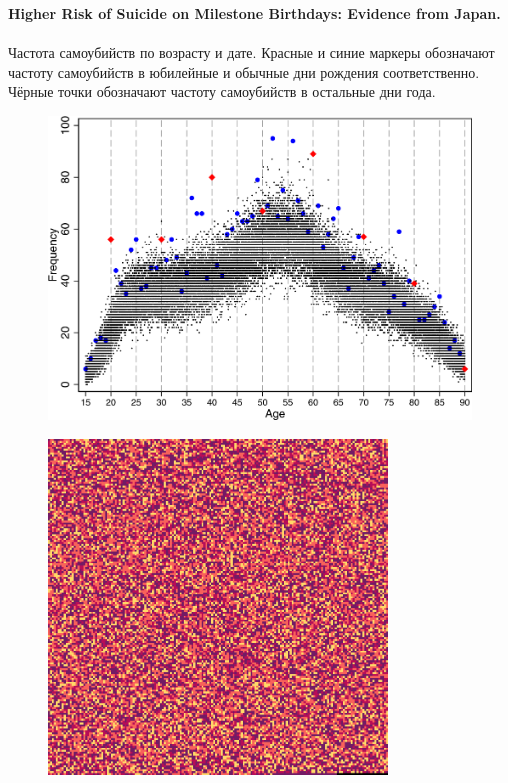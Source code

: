 \documentclass{beamer}
\begin{document}
\begin{frame}
\textbf{Higher Risk of Suicide on Milestone Birthdays: Evidence from Japan.}\\
\\
Частота самоубийств по возрасту и дате. Красные и синие маркеры обозначают частоту самоубийств в юбилейные и обычные дни рождения соответственно. Чёрные точки обозначают частоту самоубийств в остальные дни года.

\end{frame}

\begin{frame}

\begin{figure}
	\centering
	\includegraphics[width=120mm]{suicide2.png}
\end{figure}

\end{frame}

\begin{frame}

\begin{figure}
	\centering
	\includegraphics[width=90mm]{coronavirus.png}
\end{figure}

\end{frame}
\end{document}
